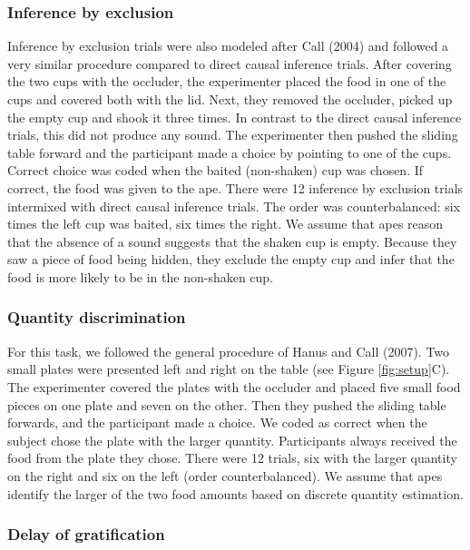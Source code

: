 \documentclass[
  man,floatsintext]{apa6}
\begin{document}
\hypertarget{inference-by-exclusion}{%
\subsubsection{Inference by exclusion}\label{inference-by-exclusion}}

Inference by exclusion trials were also modeled after Call (2004) and followed a very similar procedure compared to direct causal inference trials. After covering the two cups with the occluder, the experimenter placed the food in one of the cups and covered both with the lid. Next, they removed the occluder, picked up the empty cup and shook it three times. In contrast to the direct causal inference trials, this did not produce any sound. The experimenter then pushed the sliding table forward and the participant made a choice by pointing to one of the cups. Correct choice was coded when the baited (non-shaken) cup was chosen. If correct, the food was given to the ape. There were 12 inference by exclusion trials intermixed with direct causal inference trials. The order was counterbalanced: six times the left cup was baited, six times the right. We assume that apes reason that the absence of a sound suggests that the shaken cup is empty. Because they saw a piece of food being hidden, they exclude the empty cup and infer that the food is more likely to be in the non-shaken cup.

\hypertarget{quantity-discrimination}{%
\subsubsection{Quantity discrimination}\label{quantity-discrimination}}

For this task, we followed the general procedure of Hanus and Call (2007). Two small plates were presented left and right on the table (see Figure \ref{fig:setup}C). The experimenter covered the plates with the occluder and placed five small food pieces on one plate and seven on the other. Then they pushed the sliding table forwards, and the participant made a choice. We coded as correct when the subject chose the plate with the larger quantity. Participants always received the food from the plate they chose. There were 12 trials, six with the larger quantity on the right and six on the left (order counterbalanced). We assume that apes identify the larger of the two food amounts based on discrete quantity estimation.

\hypertarget{delay-of-gratification}{%
\subsubsection{Delay of gratification}\label{delay-of-gratification}}
\end{document}
